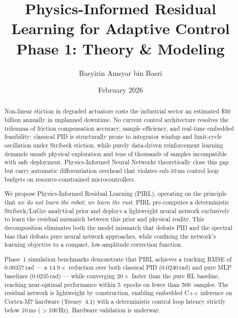 \documentclass[11pt, a4paper]{article}
\title{Physics-Informed Residual Learning for Adaptive Control\\
\large Phase 1: Theory \& Modeling}
\author{Basyirin Amsyar bin Basri}
\date{February 2026}
\begin{document}
\maketitle


\begin{abstract}

Non-linear stiction in degraded actuators costs the industrial sector an
estimated \$50 billion annually in unplanned downtime.
No current control architecture resolves the trilemma of friction
compensation accuracy, sample efficiency, and real-time embedded
feasibility: classical PID is structurally prone to integrator windup and
limit-cycle oscillation under Stribeck stiction, while purely data-driven
reinforcement learning demands unsafe physical exploration and tens of
thousands of samples incompatible with safe deployment.
Physics-Informed Neural Networks theoretically close this gap but carry
automatic differentiation overhead that violates sub-10\,ms control loop
budgets on resource-constrained microcontrollers.

We propose Physics-Informed Residual Learning (PIRL), operating on the
principle that \emph{we do not learn the robot; we learn the rust}.
PIRL pre-computes a deterministic Stribeck/LuGre analytical prior and
deploys a lightweight neural network exclusively to learn the residual
mismatch between this prior and physical reality.
This decomposition eliminates both the model mismatch that defeats PID and
the spectral bias that defeats pure neural network approaches, while
confining the network's learning objective to a compact, low-amplitude
correction function.

Phase~1 simulation benchmarks demonstrate that PIRL achieves a tracking
RMSE of $0.00357$\,rad --- a $14.9\times$ reduction over both classical
PID ($0.0240$\,rad) and pure MLP baselines ($0.0235$\,rad) --- while
converging $20\times$ faster than the pure RL baseline, reaching
near-optimal performance within 5~epochs on fewer than 500~samples.
The residual network is lightweight by construction, enabling embedded
C++ inference on Cortex-M7 hardware (Teensy~4.1) with a deterministic
control loop latency strictly below 10\,ms ($>$100\,Hz).
Hardware validation is underway.

\end{abstract}
\end{document}
